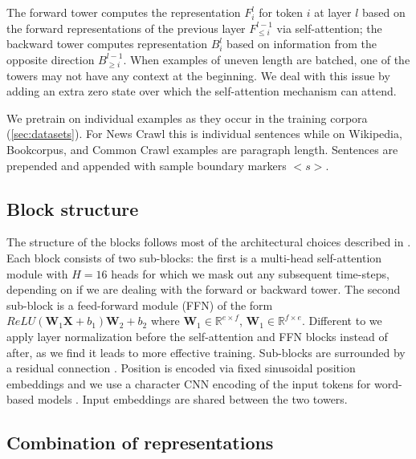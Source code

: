 \documentclass[11pt,a4paper]{article}
\def\mW{{\bm{W}}}
\def\mX{{\bm{X}}}
\newcommand{\R}{\mathbb{R}}
\begin{document}
The forward tower computes the representation $F^l_i$ for token $i$ at layer $l$ based on the forward representations of the previous layer $F^{l-1}_{\le i}$ via self-attention; the backward tower computes representation $B^l_i$ based on information from the opposite direction $B^{l-1}_{\ge i}$.
When examples of uneven length are batched, one of the towers may not have any context at the beginning. 
We deal with this issue by adding an extra zero state over which the self-attention mechanism can attend.

We pretrain on individual examples as they occur in the training corpora (\textsection\ref{sec:datasets}).
For News Crawl this is individual sentences while on Wikipedia, Bookcorpus, and Common Crawl examples are paragraph length.
Sentences are prepended and appended with sample boundary markers $<s>$.



\subsection{Block structure}
\label{sec:block}
The structure of the blocks follows most of the architectural choices described in \citet{vaswani2017transformer}.
Each block consists of two sub-blocks: the first is a multi-head self-attention module with $H=16$ heads for which we mask out any subsequent time-steps, depending on if we are dealing with the forward or backward tower.
The second sub-block is a feed-forward module (FFN) of the form $ReLU(\mW_1 \mX + b_1) \mW_2 + b_2$ where $\mW_1 \in \R^{e \times f}$, $\mW_1 \in \R^{f \times e}$.
Different to \citet{vaswani2017transformer} we apply layer normalization before the self-attention and FFN blocks instead of after, as we find it leads to more effective training.
Sub-blocks are surrounded by a residual connection \citep{he2015deep}.
Position is encoded via fixed sinusoidal position embeddings and we use a character CNN encoding of the input tokens for word-based models \citep{kim2016character}.
Input embeddings are shared between the two towers.

\subsection{Combination of representations}
\end{document}
